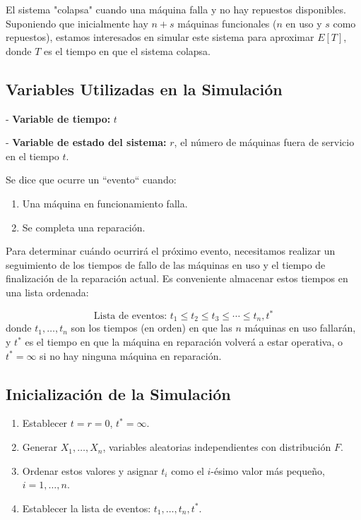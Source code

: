 \documentclass[a4paper, 12pt]{article}
\begin{document}
El sistema "colapsa" cuando una máquina falla y no hay repuestos disponibles. Suponiendo que inicialmente hay $ n + s $ máquinas funcionales ($ n $ en uso y $ s $ como repuestos), estamos interesados en simular este sistema para aproximar $ E[T] $, donde $ T $ es el tiempo en que el sistema colapsa.

\subsection*{Variables Utilizadas en la Simulación}

    
- \textbf{Variable de tiempo:} $ t $
    
- \textbf{Variable de estado del sistema:} $ r $, el número de máquinas fuera de servicio en el tiempo $ t $.


Se dice que ocurre un ``evento`` cuando:
\begin{enumerate}
    \item Una máquina en funcionamiento falla.
    \item Se completa una reparación.
\end{enumerate}

Para determinar cuándo ocurrirá el próximo evento, necesitamos realizar un seguimiento de los tiempos de fallo de las máquinas en uso y el tiempo de finalización de la reparación actual. Es conveniente almacenar estos tiempos en una lista ordenada:

\[
\text{Lista de eventos: } t_1 \leq t_2 \leq t_3 \leq \cdots \leq t_n, t^*
\]
donde $ t_1, \dots, t_n $ son los tiempos (en orden) en que las $ n $ máquinas en uso fallarán, y $ t^* $ es el tiempo en que la máquina en reparación volverá a estar operativa, o $ t^* = \infty $ si no hay ninguna máquina en reparación.

\subsection*{Inicialización de la Simulación}
\begin{enumerate}
    \item Establecer $ t = r = 0 $, $ t^* = \infty $.
    \item Generar $ X_1, \dots, X_n $, variables aleatorias independientes con distribución $ F $.
    \item Ordenar estos valores y asignar $ t_i $ como el $ i $-ésimo valor más pequeño, $ i = 1, \dots, n $.
    \item Establecer la lista de eventos: $ t_1, \dots, t_n, t^* $.
\end{enumerate}
\end{document}
